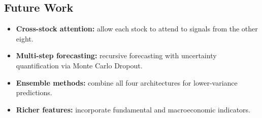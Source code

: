 \documentclass[11pt]{article}
\begin{document}
\subsection{Future Work}

\begin{itemize}
  \item \textbf{Cross-stock attention:} allow each stock to attend to
        signals from the other eight.
  \item \textbf{Multi-step forecasting:} recursive forecasting with
        uncertainty quantification via Monte Carlo Dropout.
  \item \textbf{Ensemble methods:} combine all four architectures for
        lower-variance predictions.
  \item \textbf{Richer features:} incorporate fundamental and
        macroeconomic indicators.
\end{itemize}
\end{document}
